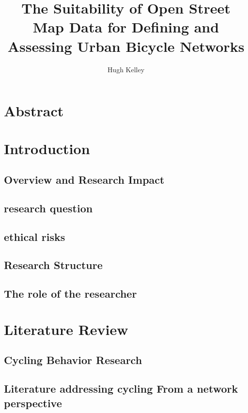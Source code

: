 \documentclass[11pt]{article} %
\title{The Suitability of Open Street Map Data for Defining and Assessing Urban Bicycle Networks}
\author{Hugh Kelley}
\begin{document}
\maketitle

\section{Abstract}

\tableofcontents
\listoffigures
\listoftables

\section{Introduction}

\subsection{Overview and Research Impact}

\subsection{research question}

\subsection{ethical risks}

\subsection{Research Structure}

\subsection{The role of the researcher}

\section{Literature Review}

\subsection{Cycling Behavior Research}

\subsection{Literature addressing cycling From a network perspective}
\end{document}
